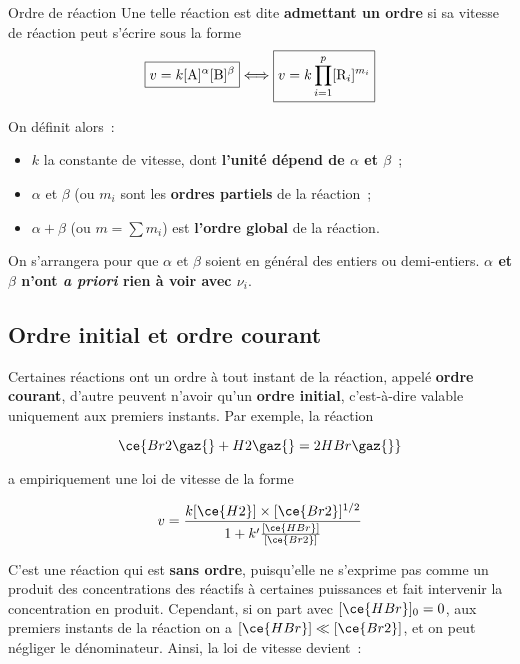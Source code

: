 \documentclass[../main/main.tex]{subfiles}
\begin{document}
\begin{defi}[label=def:ordre, hand]{Ordre de réaction}
    Une telle réaction est dite \textbf{admettant un ordre} si sa vitesse de
    réaction peut s'écrire sous la forme
    {
    \[\boxed{v = k[\rm{A}]^\alpha[\rm{B}]^\beta}
    \Longleftrightarrow
    \boxed{v = k \prod_{i=1}^{p}[{\rm R}_i]^{m_i}}
    \]}\vspace{-20pt}
    \begin{center}
        \hspace*{-17pt}
    \end{center}
    On définit alors~:
    \begin{itemize}
        \item $k$ la constante de vitesse, dont \textbf{l'unité dépend de
            $\alpha$ et $\beta$}~;
        \item $\alpha$ et $\beta$ (ou $m_i$ sont les \textbf{ordres partiels} de
            la réaction~;
        \item $\alpha + \beta$ (ou $m = \sum m_i$) est \textbf{l'ordre global}
            de la réaction.
    \end{itemize}
    On s'arrangera pour que $\alpha$ et $\beta$ soient en général des entiers ou
    demi-entiers. \textbf{$\alpha$ et $\beta$ n'ont \textit{a priori} rien à
    voir avec $\nu_i$}.
\end{defi}

\subsection{Ordre initial et ordre courant}

Certaines réactions ont un ordre à tout instant de la réaction, appelé
\textbf{ordre courant}, d'autre peuvent n'avoir qu'un \textbf{ordre initial},
c'est-à-dire valable uniquement aux premiers instants. Par exemple, la réaction

\[\ce{Br2\gaz{} + H2\gaz{} = 2HBr\gaz{}}\]

a empiriquement une loi de vitesse de la forme

\[v = \frac{k[\ce{H2}]\times[\ce{Br2}]^{1/2}}{1+k'
\frac{[\ce{HBr}]}{[\ce{Br2}]}}\]

C'est une réaction qui est \textbf{sans ordre}, puisqu'elle ne s'exprime pas
comme un produit des concentrations des réactifs à certaines puissances et fait
intervenir la concentration en produit. Cependant, si on part avec $[\ce{HBr}]_0 =
0$, aux premiers instants de la réaction on a $[\ce{HBr}] \ll [\ce{Br2}]$, et on
peut négliger le dénominateur. Ainsi, la loi de vitesse devient~:
\end{document}
